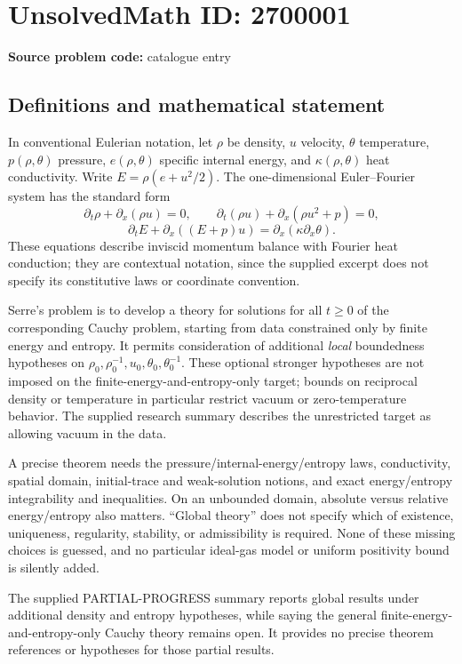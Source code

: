 \documentclass[11pt]{article}
\begin{document}
\section*{UnsolvedMath ID: 2700001}
\textbf{Source problem code:} catalogue entry
\subsection{Definitions and mathematical statement}
In conventional Eulerian notation, let \(\rho\) be density, \(u\) velocity, \(\theta\) temperature, \(p(\rho,\theta)\) pressure, \(e(\rho,\theta)\) specific internal energy, and \(\kappa(\rho,\theta)\) heat conductivity. Write \(E=\rho(e+u^2/2)\). The one-dimensional Euler--Fourier system has the standard form
\[
\partial_t\rho+\partial_x(\rho u)=0,
\qquad
\partial_t(\rho u)+\partial_x(\rho u^2+p)=0,
\]
\[
\partial_tE+\partial_x((E+p)u)=\partial_x(\kappa\partial_x\theta).
\]
These equations describe inviscid momentum balance with Fourier heat conduction; they are contextual notation, since the supplied excerpt does not specify its constitutive laws or coordinate convention.

Serre's problem is to develop a theory for solutions for all \(t\ge0\) of the corresponding Cauchy problem, starting from data constrained only by finite energy and entropy. It permits consideration of additional \emph{local} boundedness hypotheses on \(\rho_0,\rho_0^{-1},u_0,\theta_0,\theta_0^{-1}\). These optional stronger hypotheses are not imposed on the finite-energy-and-entropy-only target; bounds on reciprocal density or temperature in particular restrict vacuum or zero-temperature behavior. The supplied research summary describes the unrestricted target as allowing vacuum in the data.

A precise theorem needs the pressure/internal-energy/entropy laws, conductivity, spatial domain, initial-trace and weak-solution notions, and exact energy/entropy integrability and inequalities. On an unbounded domain, absolute versus relative energy/entropy also matters. ``Global theory'' does not specify which of existence, uniqueness, regularity, stability, or admissibility is required. None of these missing choices is guessed, and no particular ideal-gas model or uniform positivity bound is silently added.

The supplied PARTIAL-PROGRESS summary reports global results under additional density and entropy hypotheses, while saying the general finite-energy-and-entropy-only Cauchy theory remains open. It provides no precise theorem references or hypotheses for those partial results.
\end{document}
